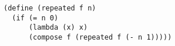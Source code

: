 \documentclass[a4paper,12pt]{article}
\begin{document}
\begin{lstlisting}
(define (repeated f n)
  (if (= n 0)
      (lambda (x) x)
      (compose f (repeated f (- n 1)))))
\end{lstlisting}
\end{document}
